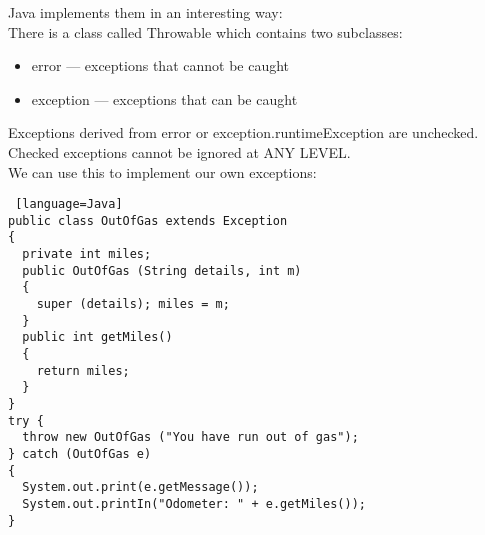\documentclass[../../lecture_notes.tex]{subfiles}
\begin{document}
\noindent Java implements them in an interesting way:\\
\indent There is a class called Throwable which contains two subclasses:
\begin{itemize} [itemsep=0mm]
	\item error — exceptions that cannot be caught
	\item exception — exceptions that can be caught
\end{itemize}
\noindent Exceptions derived from error or exception.runtimeException are unchecked.\\
Checked exceptions cannot be ignored at ANY LEVEL.\\
We can use this to implement our own exceptions:\\
\begin{lstlisting} [language=Java]
public class OutOfGas extends Exception
{
  private int miles;
  public OutOfGas (String details, int m) 
  {
    super (details); miles = m;
  }
  public int getMiles() 
  {
    return miles;
  }
}
try {
  throw new OutOfGas ("You have run out of gas");
} catch (OutOfGas e) 
{
  System.out.print(e.getMessage());
  System.out.printIn("Odometer: " + e.getMiles());
}
\end{lstlisting} \medskip
\end{document}
